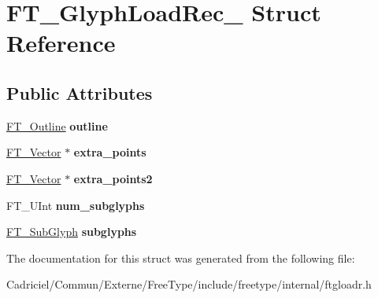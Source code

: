 \hypertarget{struct_f_t___glyph_load_rec__}{}\section{F\+T\+\_\+\+Glyph\+Load\+Rec\+\_\+ Struct Reference}
\label{struct_f_t___glyph_load_rec__}
\subsection*{Public Attributes}
\begin{DoxyCompactItemize}
\item 
\hyperlink{struct_f_t___outline__}{F\+T\+\_\+\+Outline} {\bfseries outline}\hypertarget{struct_f_t___glyph_load_rec___ae340cdb5263322e86c640b15f82ea72a}{}\label{struct_f_t___glyph_load_rec___ae340cdb5263322e86c640b15f82ea72a}

\item 
\hyperlink{struct_f_t___vector__}{F\+T\+\_\+\+Vector} $\ast$ {\bfseries extra\+\_\+points}\hypertarget{struct_f_t___glyph_load_rec___ad2547bd6a7c7473d3a4646dfe908f1c3}{}\label{struct_f_t___glyph_load_rec___ad2547bd6a7c7473d3a4646dfe908f1c3}

\item 
\hyperlink{struct_f_t___vector__}{F\+T\+\_\+\+Vector} $\ast$ {\bfseries extra\+\_\+points2}\hypertarget{struct_f_t___glyph_load_rec___a5e8bbe62bd889e806700bc0d583ff79b}{}\label{struct_f_t___glyph_load_rec___a5e8bbe62bd889e806700bc0d583ff79b}

\item 
F\+T\+\_\+\+U\+Int {\bfseries num\+\_\+subglyphs}\hypertarget{struct_f_t___glyph_load_rec___a71dc4ab52b956b974fe65c95a098e03c}{}\label{struct_f_t___glyph_load_rec___a71dc4ab52b956b974fe65c95a098e03c}

\item 
\hyperlink{struct_f_t___sub_glyph_rec__}{F\+T\+\_\+\+Sub\+Glyph} {\bfseries subglyphs}\hypertarget{struct_f_t___glyph_load_rec___a12ef145fedbeb14cc8b9d320ae3fed96}{}\label{struct_f_t___glyph_load_rec___a12ef145fedbeb14cc8b9d320ae3fed96}

\end{DoxyCompactItemize}


The documentation for this struct was generated from the following file\+:\begin{DoxyCompactItemize}
\item 
Cadriciel/\+Commun/\+Externe/\+Free\+Type/include/freetype/internal/ftgloadr.\+h\end{DoxyCompactItemize}
